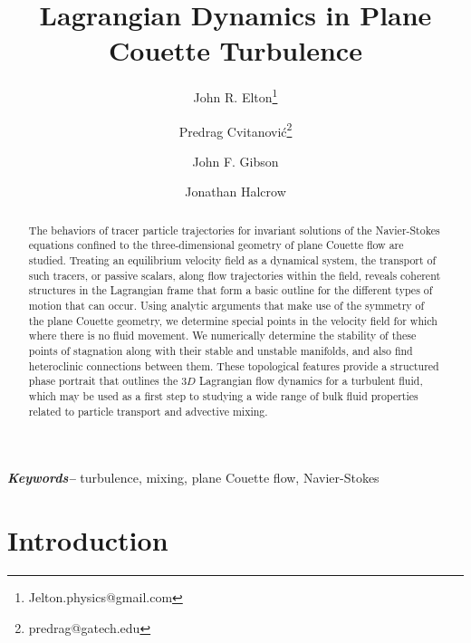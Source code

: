 \documentclass[letter,12pt,openany]{article}
\title{Lagrangian Dynamics in Plane Couette Turbulence}
\author[1]{John R. Elton\thanks{Jelton.physics@gmail.com}}
\author[1]{Predrag Cvitanovi\'{c}\thanks{predrag@gatech.edu}}
\author[1]{John F. Gibson}
\author[1]{Jonathan Halcrow}
\affil[1]{Center for Nonlinear Science, School of Physics, Georgia Institute of Technology, Atlanta, GA}
\providecommand{\keywords}[1]
{
  \small	
  \textbf{\textit{Keywords--}} #1
}
\begin{document}
    
\date{}

\maketitle

\begin{abstract}
\noindent 
The behaviors of tracer particle trajectories for invariant solutions of the Navier-Stokes equations confined to the three-dimensional geometry of plane Couette flow are studied. Treating an equilibrium velocity field as a dynamical system, the transport of such tracers, or passive scalars, along flow trajectories within the field, reveals coherent structures in the Lagrangian frame that form a basic outline for the different types of motion that can occur. Using analytic arguments that make use of the symmetry of the plane Couette geometry, we determine special points in the velocity field for which where there is no fluid movement. We numerically determine the stability of these points of stagnation along with their stable and unstable manifolds, and also find heteroclinic connections between them. These topological features provide a structured phase portrait that outlines the $3D$ Lagrangian flow dynamics for a turbulent fluid, which may be used as a first step to studying a wide range of bulk fluid properties related to particle transport and advective mixing.
\end{abstract}


\keywords{turbulence, mixing, plane Couette flow, Navier-Stokes}


\section{\centering Introduction}
\label{sec:intro}
\end{document}

